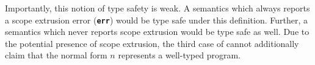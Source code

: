 Importantly, this notion of type safety is weak. A semantics which always reports a scope extrusion error (\textbf{\texttt{err}}) would be type safe under this definition. Further, a semantics which never reports scope extrusion would be type safe as well. Due to the potential presence of scope extrusion, the third case of  cannot additionally claim that the normal form $n$ represents a well-typed \efflang{} program. 






    




